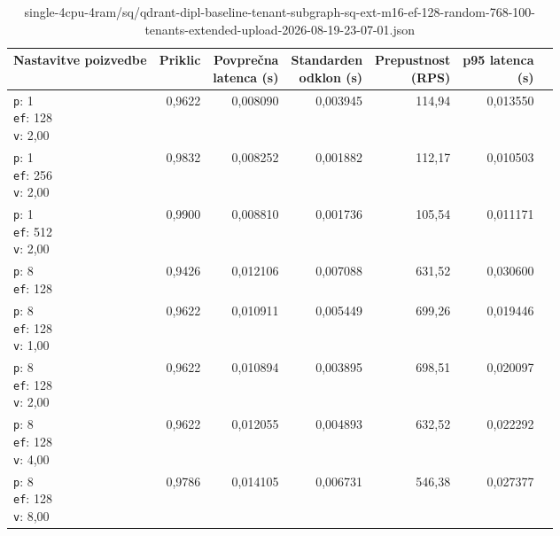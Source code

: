 \begin{table}[htbp]
  \centering
\small
  \caption{single-4cpu-4ram/sq/qdrant-dipl-baseline-tenant-subgraph-sq-ext-m16-ef-128-random-768-100-tenants-extended-upload-2026-08-19-23-07-01.json}
  \label{tab:single-4cpu-4ram:sq:qdrant-dipl-baseline-tenant-subgraph-sq-ext-m16-ef-128-random-768-100-tenants-extended-upload-2026-08-19-23-07-01.json}
  \begin{tabularx}{\textwidth}{Xrrrrrr}
    \toprule
    Nastavitve poizvedbe & Priklic & \makecell{Povprečna\\latenca (s)} & \makecell{Standarden\\odklon (s)} & \makecell{Prepustnost\\(RPS)} & \makecell{p95 latenca\\(s)}  \\
    \midrule
    \makecell{\texttt{p}: 1\\\texttt{ef}: 128\\\texttt{v}: 2,00} & 0,9622 & 0,008090 & 0,003945 & 114,94 & 0,013550 \\
    \makecell{\texttt{p}: 1\\\texttt{ef}: 256\\\texttt{v}: 2,00} & 0,9832 & 0,008252 & 0,001882 & 112,17 & 0,010503 \\
    \makecell{\texttt{p}: 1\\\texttt{ef}: 512\\\texttt{v}: 2,00} & 0,9900 & 0,008810 & 0,001736 & 105,54 & 0,011171 \\
    \makecell{\texttt{p}: 8\\\texttt{ef}: 128} & 0,9426 & 0,012106 & 0,007088 & 631,52 & 0,030600 \\
    \makecell{\texttt{p}: 8\\\texttt{ef}: 128\\\texttt{v}: 1,00} & 0,9622 & 0,010911 & 0,005449 & 699,26 & 0,019446 \\
    \makecell{\texttt{p}: 8\\\texttt{ef}: 128\\\texttt{v}: 2,00} & 0,9622 & 0,010894 & 0,003895 & 698,51 & 0,020097 \\
    \makecell{\texttt{p}: 8\\\texttt{ef}: 128\\\texttt{v}: 4,00} & 0,9622 & 0,012055 & 0,004893 & 632,52 & 0,022292 \\
    \makecell{\texttt{p}: 8\\\texttt{ef}: 128\\\texttt{v}: 8,00} & 0,9786 & 0,014105 & 0,006731 & 546,38 & 0,027377 \\

\end{tabularx}
\end{table}
